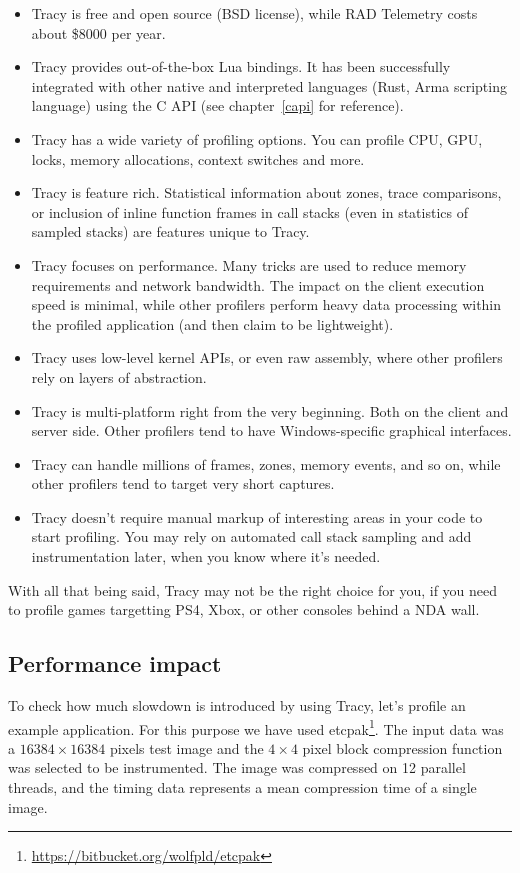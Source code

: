 \documentclass[hidelinks,titlepage,a4paper]{article}
\begin{document}
\begin{itemize}
\item Tracy is free and open source (BSD license), while RAD Telemetry costs about \$8000 per year.
\item Tracy provides out-of-the-box Lua bindings. It has been successfully integrated with other native and interpreted languages (Rust, Arma scripting language) using the C API (see chapter~\ref{capi} for reference).
\item Tracy has a wide variety of profiling options. You can profile CPU, GPU, locks, memory allocations, context switches and more.
\item Tracy is feature rich. Statistical information about zones, trace comparisons, or inclusion of inline function frames in call stacks (even in statistics of sampled stacks) are features unique to Tracy.
\item Tracy focuses on performance. Many tricks are used to reduce memory requirements and network bandwidth. The impact on the client execution speed is minimal, while other profilers perform heavy data processing within the profiled application (and then claim to be lightweight).
\item Tracy uses low-level kernel APIs, or even raw assembly, where other profilers rely on layers of abstraction.
\item Tracy is multi-platform right from the very beginning. Both on the client and server side. Other profilers tend to have Windows-specific graphical interfaces.
\item Tracy can handle millions of frames, zones, memory events, and so on, while other profilers tend to target very short captures.
\item Tracy doesn't require manual markup of interesting areas in your code to start profiling. You may rely on automated call stack sampling and add instrumentation later, when you know where it's needed.
\end{itemize}

With all that being said, Tracy may not be the right choice for you, if you need to profile games targetting PS4, Xbox, or other consoles behind a NDA wall.

\subsection{Performance impact}
\label{perfimpact}

To check how much slowdown is introduced by using Tracy, let's profile an example application. For this purpose we have used etcpak\footnote{\url{https://bitbucket.org/wolfpld/etcpak}}. The input data was a $16384 \times 16384$ pixels test image and the $4 \times 4$ pixel block compression function was selected to be instrumented. The image was compressed on 12 parallel threads, and the timing data represents a mean compression time of a single image.
\end{document}
